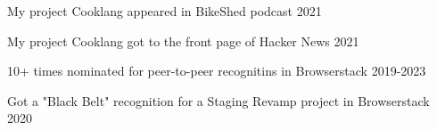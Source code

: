 
\begin{cventries}

  \cvblitz
    {My project Cooklang appeared in BikeShed podcast}
    {}
    {}
    {}
    {2021} %

  \cvblitz
    {My project Cooklang got to the front page of Hacker News}
    {}
    {}
    {}
    {2021} %


  \cvblitz
    {10+ times nominated for peer-to-peer recognitins in Browserstack}
    {}
    {}
    {}
    {2019-2023} %

  \cvblitz
    {Got a "Black Belt" recognition for a Staging Revamp project in Browserstack}
    {}
    {}
    {}
    {2020} %

\end{cventries}
